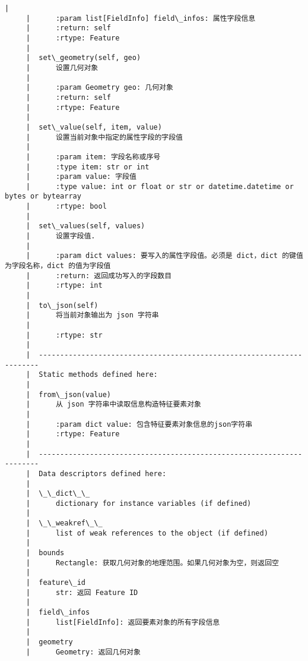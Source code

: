 \documentclass[11pt]{article}
\begin{document}
\begin{Verbatim}[commandchars=\\\{\}]
     |      
     |      :param list[FieldInfo] field\_infos: 属性字段信息
     |      :return: self
     |      :rtype: Feature
     |  
     |  set\_geometry(self, geo)
     |      设置几何对象
     |      
     |      :param Geometry geo: 几何对象
     |      :return: self
     |      :rtype: Feature
     |  
     |  set\_value(self, item, value)
     |      设置当前对象中指定的属性字段的字段值
     |      
     |      :param item: 字段名称或序号
     |      :type item: str or int
     |      :param value: 字段值
     |      :type value: int or float or str or datetime.datetime or bytes or bytearray
     |      :rtype: bool
     |  
     |  set\_values(self, values)
     |      设置字段值.
     |      
     |      :param dict values: 要写入的属性字段值。必须是 dict，dict 的键值为字段名称，dict 的值为字段值
     |      :return: 返回成功写入的字段数目
     |      :rtype: int
     |  
     |  to\_json(self)
     |      将当前对象输出为 json 字符串
     |      
     |      :rtype: str
     |  
     |  ----------------------------------------------------------------------
     |  Static methods defined here:
     |  
     |  from\_json(value)
     |      从 json 字符串中读取信息构造特征要素对象
     |      
     |      :param dict value: 包含特征要素对象信息的json字符串
     |      :rtype: Feature
     |  
     |  ----------------------------------------------------------------------
     |  Data descriptors defined here:
     |  
     |  \_\_dict\_\_
     |      dictionary for instance variables (if defined)
     |  
     |  \_\_weakref\_\_
     |      list of weak references to the object (if defined)
     |  
     |  bounds
     |      Rectangle: 获取几何对象的地理范围。如果几何对象为空，则返回空
     |  
     |  feature\_id
     |      str: 返回 Feature ID
     |  
     |  field\_infos
     |      list[FieldInfo]: 返回要素对象的所有字段信息
     |  
     |  geometry
     |      Geometry: 返回几何对象
    

\end{Verbatim}
\end{document}
